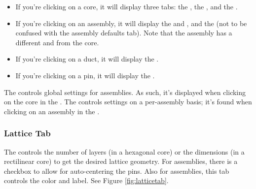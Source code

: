 \begin{itemize}
	\item{If you're clicking on a core, it will display three tabs: the , the , and the .}
	\item{If you're clicking on an assembly, it will display the  and , and the  (not to be confused with the assembly defaults tab).  Note that the assembly has a different  and  from the core.}
	\item{If you're clicking on a duct, it will display the .}
	\item{If you're clicking on a pin, it will display the .}
\end{itemize}

\begin{commonerrors}
	The  controls global settings for assemblies.  As such, it's displayed when clicking on the core in the .  The  controls settings on a per-assembly basis; it's found when clicking on an assembly in the .
\end{commonerrors}

\subsubsection{Lattice Tab}
The  controls the number of layers (in a hexagonal core) or the dimensions (in a rectilinear core) to get the desired lattice geometry.  For assemblies, there is a checkbox to allow for auto-centering the pins.  Also for assemblies, this tab controls the  color and label.  See Figure \ref{fig:latticetab}.

